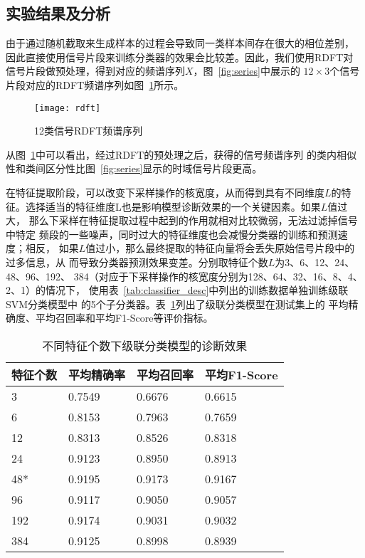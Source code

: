 \subsection{实验结果及分析}
\label{subsection:cascade_result}

由于通过随机截取来生成样本的过程会导致同一类样本间存在很大的相位差别，
因此直接使用信号片段来训练分类器的效果会比较差。因此，我们使用RDFT对
信号片段做预处理，得到对应的频谱序列$X$，图~\ref{fig:series}中展示的
$12\times 3$个信号片段对应的RDFT频谱序列如图~\ref{fig:rdft}所示。
\begin{figure}[ht]
  \centering
  \texttt{[image: rdft]}
  \caption{12类信号RDFT频谱序列}
  \label{fig:rdft}
\end{figure}

从图~\ref{fig:rdft}中可以看出，经过RDFT的预处理之后，获得的信号频谱序列
的类内相似性和类间区分性比图~\ref{fig:series}显示的时域信号片段更高。

在特征提取阶段，可以改变下采样操作的核宽度，从而得到具有不同维度$L$的特
征。选择适当的特征维度L也是影响模型诊断效果的一个关键因素。如果$L$值过大，
那么下采样在特征提取过程中起到的作用就相对比较微弱，无法过滤掉信号中特定
频段的一些噪声，同时过大的特征维度也会减慢分类器的训练和预测速度；相反，
如果$L$值过小，那么最终提取的特征向量将会丢失原始信号片段中的过多信息，从
而导致分类器预测效果变差。分别取特征个数$L$为3、6、12、24、48、96、192、
384（对应于下采样操作的核宽度分别为128、64、32、16、8、4、2、1）的情况下，
使用表~\ref{tab:classifier_desc}中列出的训练数据单独训练级联SVM分类模型中
的5个子分类器。表~\ref{tab:dim_performance}列出了级联分类模型在测试集上的
平均精确度、平均召回率和平均F1-Score等评价指标。
\begin{table}[htb]
  \centering
  \begin{minipage}[t]{0.8\linewidth}
  \caption{不同特征个数下级联分类模型的诊断效果}
  \label{tab:dim_performance}
    \begin{tabularx}{\linewidth}{XXXX}
      \toprule[1.5pt]
        特征个数 & 平均精确率 & 平均召回率 & 平均F1-Score \\
      \midrule[1pt]
        3   & 0.7549 & 0.6676 & 0.6615 \\
        6   & 0.8153 & 0.7963 & 0.7659 \\
        12  & 0.8313 & 0.8526 & 0.8318 \\
        24  & 0.9123 & 0.8950 & 0.8913 \\
        48* & 0.9195 & 0.9173 & 0.9167 \\
        96  & 0.9117 & 0.9050 & 0.9057 \\
        192 & 0.9174 & 0.9031 & 0.9032 \\
        384 & 0.9125 & 0.8998 & 0.8939 \\
      \bottomrule[1.5pt]
    \end{tabularx}
  \end{minipage}
\end{table}

